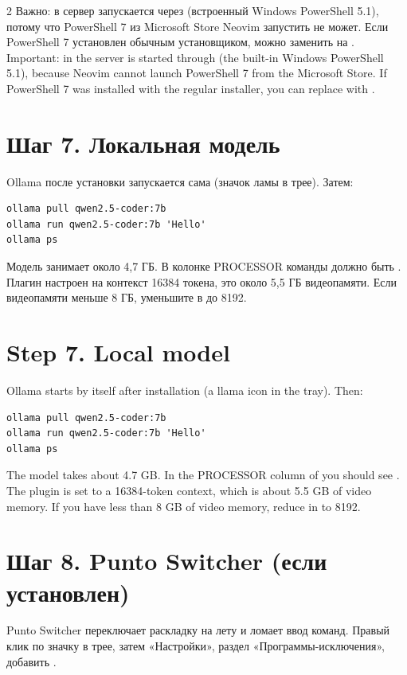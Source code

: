 \begin{paracol}{2}
\RU
Важно: в  сервер запускается через  (встроенный Windows PowerShell 5.1), потому что PowerShell 7 из Microsoft Store Neovim запустить не может. Если PowerShell 7 установлен обычным установщиком, можно заменить  на .
\switchcolumn
\EN
Important: in  the server is started through  (the built-in Windows PowerShell 5.1), because Neovim cannot launch PowerShell 7 from the Microsoft Store. If PowerShell 7 was installed with the regular installer, you can replace  with .
\switchcolumn*

\RU
\section*{Шаг 7. Локальная модель}
Ollama после установки запускается сама (значок ламы в трее). Затем:
\begin{lstlisting}
ollama pull qwen2.5-coder:7b
ollama run qwen2.5-coder:7b 'Hello'
ollama ps
\end{lstlisting}
Модель занимает около 4,7 ГБ. В колонке PROCESSOR команды  должно быть . Плагин настроен на контекст 16384 токена, это около 5,5 ГБ видеопамяти. Если видеопамяти меньше 8 ГБ, уменьшите  в  до 8192.
\switchcolumn
\EN
\section*{Step 7. Local model}
Ollama starts by itself after installation (a llama icon in the tray). Then:
\begin{lstlisting}
ollama pull qwen2.5-coder:7b
ollama run qwen2.5-coder:7b 'Hello'
ollama ps
\end{lstlisting}
The model takes about 4.7 GB. In the PROCESSOR column of  you should see . The plugin is set to a 16384-token context, which is about 5.5 GB of video memory. If you have less than 8 GB of video memory, reduce  in  to 8192.
\switchcolumn*

\RU
\section*{Шаг 8. Punto Switcher (если установлен)}
Punto Switcher переключает раскладку на лету и ломает ввод команд. Правый клик по значку в трее, затем «Настройки», раздел «Программы-исключения», добавить .
\switchcolumn
\EN

\end{paracol}
